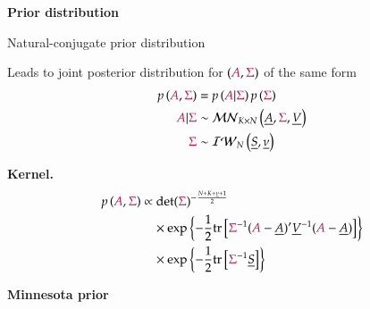 \documentclass[notes,blackandwhite,mathsans,usenames,dvipsnames]{beamer}
\begin{document}
{
\begin{frame}

\begin{adjustwidth}{-0.5cm}{0cm}
\vspace{8.3cm}\Large
\textbf{{\color{mcxs1}Prior} {\color{mcxs4}distribution}}
\end{adjustwidth}

\end{frame}
}




\begin{frame}{Natural-conjugate prior distribution}

{\color{mcxs2}Leads to joint posterior distribution for} $({\color{purple}A}, {\color{purple}\Sigma})$ {\color{mcxs2}of the same form}
\begin{align*} 
p\left( {\color{purple}A}, {\color{purple}\Sigma} \right) &= p\left( {\color{purple}A}| {\color{purple}\Sigma} \right)p\left( {\color{purple}\Sigma} \right)\\
{\color{purple}A}|{\color{purple}\Sigma} &\sim \mathcal{MN}_{K\times N}\left( \underline{A},{\color{purple}\Sigma},\underline{V} \right)\\
{\color{purple}\Sigma} &\sim \mathcal{IW}_N\left( \underline{S}, \underline{\nu} \right)
\end{align*} 

\textbf{Kernel.}
\begin{align*} 
p\left( {\color{purple}A},{\color{purple}\Sigma} \right) 
&\propto \text{det}({\color{purple}\Sigma})^{-\frac{N+K+\underline{\nu}+1}{2}}\\
&\quad\times\exp\left\{ -\frac{1}{2}\text{tr}\left[ {\color{purple}\Sigma}^{-1}({\color{purple}A}-\underline{A})'\underline{V}^{-1}({\color{purple}A}-\underline{A}) \right] \right\}\\
&\quad\times \exp\left\{ -\frac{1}{2}\text{tr}\left[ {\color{purple}\Sigma}^{-1}\underline{S} \right] \right\}
\end{align*} 
\end{frame}












{
\begin{frame}

\begin{adjustwidth}{-0.5cm}{0cm}
\vspace{8.3cm}\Large
\textbf{{\color{mcxs1}Minnesota} {\color{mcxs5}prior}}
\end{adjustwidth}

\end{frame}
}
\end{document}
